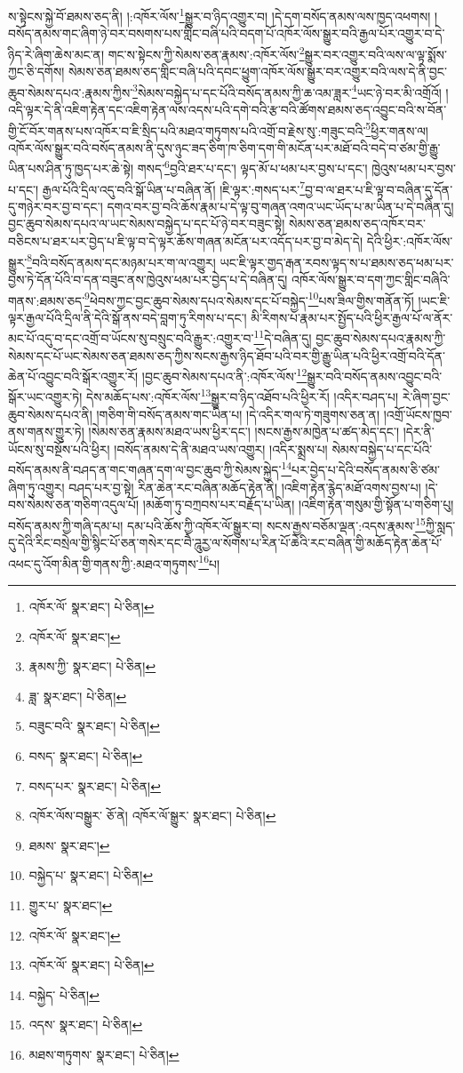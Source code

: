 ས་སྟེངས་སྐྱེ་བོ་ཐམས་ཅད་ནི། །:འཁོར་ལོས་\footnote{འཁོར་ལོ་  སྣར་ཐང་།  པེ་ཅིན། }སྒྱུར་བ་ཉིད་འགྱུར་བ། །དེ་དག་བསོད་ནམས་ལས་ཁྱད་འཕགས། །བསོད་ནམས་གང་ཞིག་ཉེ་བར་བསགས་པས་གླིང་བཞི་པའི་བདག་པོ་འཁོར་ལོས་སྒྱུར་བའི་རྒྱལ་པོར་འགྱུར་བ་དེ་ཉིད་རེ་ཞིག་ཆེས་མང་ན། གང་ས་སྟེངས་ཀྱི་སེམས་ཅན་རྣམས་:འཁོར་ལོས་\footnote{འཁོར་ལོ་  སྣར་ཐང་། }སྒྱུར་བར་འགྱུར་བའི་ལས་ལ་ལྟ་སྨོས་ཀྱང་ཅི་དགོས། སེམས་ཅན་ཐམས་ཅད་གླིང་བཞི་པའི་དབང་ཕྱུག་འཁོར་ལོས་སྒྱུར་བར་འགྱུར་བའི་ལས་དེ་ནི་བྱང་ཆུབ་སེམས་དཔའ་:རྣམས་ཀྱིས་\footnote{རྣམས་ཀྱི་  སྣར་ཐང་།  པེ་ཅིན། }སེམས་བསྐྱེད་པ་དང་པོའི་བསོད་ནམས་ཀྱི་ཆ་འམ་ཟླར་\footnote{ཟླ་  སྣར་ཐང་།  པེ་ཅིན། }ཡང་ཉེ་བར་མི་འགྲོའོ། །འདི་ལྟར་དེ་ནི་འཇིག་རྟེན་དང་འཇིག་རྟེན་ལས་འདས་པའི་དགེ་བའི་རྩ་བའི་ཚོགས་ཐམས་ཅད་འབྱུང་བའི་ས་བོན་གྱི་ངོ་བོར་གནས་པས་འཁོར་བ་ཇི་སྲིད་པའི་མཐའ་གཏུགས་པའི་འགྲོ་བ་རྗེས་སུ་:གཟུང་བའི་\footnote{བཟུང་བའི་  སྣར་ཐང་།  པེ་ཅིན། }ཕྱིར་གནས་ལ། འཁོར་ལོས་སྒྱུར་བའི་བསོད་ནམས་ནི་དུས་ཉུང་ཟད་ཅིག་ཁ་ཅིག་དག་གི་མངོན་པར་མཐོ་བའི་བདེ་བ་ཙམ་གྱི་རྒྱུ་ཡིན་པས་ཤིན་ཏུ་ཁྱད་པར་ཆེ་སྟེ། གསད་\footnote{བསད་  སྣར་ཐང་།  པེ་ཅིན། }བྱའི་ཐར་པ་དང་། ལྟད་མོ་པ་ཕམ་པར་བྱས་པ་དང་། ཁྱེའུས་ཕམ་པར་བྱས་པ་དང་། རྒྱལ་པོའི་དྲིལ་འདུ་བའི་སྒོ་ཡིན་པ་བཞིན་ནོ། །ཇི་ལྟར་:གསད་པར་\footnote{བསད་པར་  སྣར་ཐང་།  པེ་ཅིན། }བྱ་བ་ལ་ཐར་པ་ཇི་ལྟ་བ་བཞིན་དུ་དོན་དུ་གཉེར་བར་བྱ་བ་དང་། དགའ་བར་བྱ་བའི་ཆོས་རྣམ་པ་དེ་ལྟ་བུ་གཞན་འགའ་ཡང་ཡོད་པ་མ་ཡིན་པ་དེ་བཞིན་དུ། བྱང་ཆུབ་སེམས་དཔའ་ལ་ཡང་སེམས་བསྐྱེད་པ་དང་པོ་ཉེ་བར་བཟུང་སྟེ། སེམས་ཅན་ཐམས་ཅད་འཁོར་བར་བཅིངས་པ་ཐར་པར་བྱེད་པ་ཇི་ལྟ་བ་དེ་ལྟར་ཆོས་གཞན་མངོན་པར་འདོད་པར་བྱ་བ་མེད་དེ། དེའི་ཕྱིར་:འཁོར་ལོས་སྒྱུར་\footnote{འཁོར་ལོས་བསྒྱུར་  ཅོ་ནེ། འཁོར་ལོ་སྒྱུར་  སྣར་ཐང་།  པེ་ཅིན། }བའི་བསོད་ནམས་དང་མཉམ་པར་ག་ལ་འགྱུར། ཡང་ཇི་ལྟར་གྱད་རྒན་རབས་ལྟད་ས་པ་ཐམས་ཅད་ཕམ་པར་བྱས་ཏེ་དོན་པོའི་བ་དན་བཟུང་ནས་ཁྱེའུས་ཕམ་པར་བྱེད་པ་དེ་བཞིན་དུ། འཁོར་ལོས་སྒྱུར་བ་དག་ཀྱང་གླིང་བཞིའི་གནས་:ཐམས་ཅད་\footnote{ཐམས་  སྣར་ཐང་། }ཕེབས་ཀྱང་བྱང་ཆུབ་སེམས་དཔའ་སེམས་དང་པོ་བསྐྱེད་\footnote{བསྐྱེད་པ་  སྣར་ཐང་།  པེ་ཅིན། }པས་ཟིལ་གྱིས་གནོན་ཏོ། །ཡང་ཇི་ལྟར་རྒྱལ་པོའི་དྲིལ་ནི་དེའི་སྒོ་ནས་བདེ་བླག་ཏུ་རིགས་པ་དང་། མི་རིགས་པ་རྣམ་པར་སྤྱོད་པའི་ཕྱིར་རྒྱལ་པོ་ལ་ནོར་མང་པོ་འདུ་བ་དང་འགྲོ་བ་ཡོངས་སུ་བསྲུང་བའི་རྒྱུར་:འགྱུར་བ་\footnote{གྱུར་པ་  སྣར་ཐང་། }དེ་བཞིན་དུ། བྱང་ཆུབ་སེམས་དཔའ་རྣམས་ཀྱི་སེམས་དང་པོ་ཡང་སེམས་ཅན་ཐམས་ཅད་ཀྱིས་སངས་རྒྱས་ཉིད་ཐོབ་པའི་བར་གྱི་རྒྱུ་ཡིན་པའི་ཕྱིར་འགྲོ་བའི་དོན་ཆེན་པོ་འབྱུང་བའི་སྒོར་འགྱུར་རོ། །བྱང་ཆུབ་སེམས་དཔའ་ནི་:འཁོར་ལོས་\footnote{འཁོར་ལོ་  སྣར་ཐང་། }སྒྱུར་བའི་བསོད་ནམས་འབྱུང་བའི་སྒོར་ཡང་འགྱུར་ཏེ། དེས་མཆོད་པས་:འཁོར་ལོས་\footnote{འཁོར་ལོ་  སྣར་ཐང་།  པེ་ཅིན། }སྒྱུར་བ་ཉིད་འཐོབ་པའི་ཕྱིར་རོ། །འདིར་བཤད་པ། རེ་ཞིག་བྱང་ཆུབ་སེམས་དཔའ་ནི། །གཅིག་གི་བསོད་ནམས་གང་ཡིན་པ། །དེ་འདིར་གལ་ཏེ་གཟུགས་ཅན་ན། །འགྲོ་ཡོངས་ཁྱབ་ནས་གནས་གྱུར་ཏེ། །སེམས་ཅན་རྣམས་མཐའ་ཡས་ཕྱིར་དང་། །སངས་རྒྱས་མཁྱེན་པ་ཚད་མེད་དང་། །དེར་ནི་ཡོངས་སུ་བསྔོས་པའི་ཕྱིར། །བསོད་ནམས་དེ་ནི་མཐའ་ཡས་འགྱུར། །འདིར་སྨྲས་པ། སེམས་བསྐྱེད་པ་དང་པོའི་བསོད་ནམས་ནི་བཤད་ན་གང་གཞན་དག་ལ་བྱང་ཆུབ་ཀྱི་སེམས་སྐྱེད་\footnote{བསྐྱེད་  པེ་ཅིན། }པར་བྱེད་པ་དེའི་བསོད་ནམས་ཅི་ཙམ་ཞིག་ཏུ་འགྱུར། བཤད་པར་བྱ་སྟེ། རིན་ཆེན་རང་བཞིན་མཆོད་རྟེན་ནི། །འཇིག་རྟེན་རྙེད་མཐོ་འགས་བྱས་པ། །དེ་བས་སེམས་ཅན་གཅིག་འདུལ་པོ། །མཆོག་ཏུ་བཀྲབས་པར་བརྗོད་པ་ཡིན། །འཇིག་རྟེན་གསུམ་གྱི་སྟོན་པ་གཅིག་པུ། བསོད་ནམས་ཀྱི་གཞི་དམ་པ། དམ་པའི་ཆོས་ཀྱི་འཁོར་ལོ་སྒྱུར་བ། སངས་རྒྱས་བཅོམ་ལྡན་:འདས་རྣམས་\footnote{འདས་  སྣར་ཐང་།  པེ་ཅིན། }ཀྱི་སླད་དུ་དེའི་རིང་བསྲེལ་གྱི་སྙིང་པོ་ཅན་གསེར་དང་བཻ་ཌཱུརྱ་ལ་སོགས་པ་རིན་པོ་ཆེའི་རང་བཞིན་གྱི་མཆོད་རྟེན་ཆེན་པོ་འཕང་དུ་འོག་མིན་གྱི་གནས་ཀྱི་:མཐའ་གཏུགས་\footnote{མཐས་གཏུགས་  སྣར་ཐང་།  པེ་ཅིན། }པ། 
